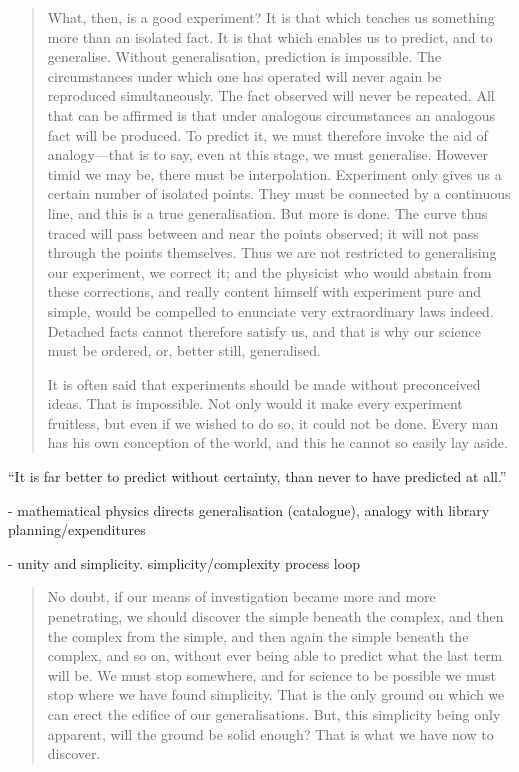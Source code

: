  
 \begin{quote}
     What, then, is a good experiment?  It is that which teaches us something more than an isolated fact.  It is that which enables us to predict, and to generalise.  Without generalisation, prediction is impossible.  The circumstances under which one has operated will never again be reproduced simultaneously.  The fact observed will never be repeated.  All that can be affirmed is that under analogous circumstances an analogous fact will be produced.  To predict it, we must therefore invoke the aid of analogy---that is to say, even at this stage, we must generalise.  However timid we may be, there must be interpolation.  Experiment only gives us a certain number of isolated points.  They must be connected by a continuous line, and this is a true generalisation.  But more is done.  The curve thus traced will pass between and near the points observed; it will not pass through the points themselves.  Thus we are not restricted to generalising our experiment, we correct it; and the physicist who would abstain from these corrections, and really content himself with experiment pure and simple, would be compelled to enunciate very extraordinary laws indeed.  Detached facts cannot therefore satisfy us, and that is why our science must be ordered, or, better still, generalised.
     
     It is often said that experiments should be made without preconceived ideas.  That is impossible.  Not only would it make every experiment fruitless, but even if we wished to do so, it could not be done.  Every man has his own conception of the world, and this he cannot so easily lay aside.  \citep[p. 142-143]{Poincare1952}
 \end{quote}
 
 ``It is far better to predict without certainty, than never to have predicted at all.'' \citep[p. 144]{Poincare1952}
 
 
 - mathematical physics directs generalisation (catalogue), analogy with library planning/expenditures
 
 - unity and simplicity.  simplicity/complexity process loop
 
 \begin{quote}
     No doubt, if our means of investigation became more and more penetrating, we should discover the simple beneath the complex, and then the complex from the simple, and then again the simple beneath the complex, and so on, without ever being able to predict what the last term will be.  We must stop somewhere, and for science to be possible we must stop where we have found simplicity.  That is the only ground on which we can erect the edifice of our generalisations.  But, this simplicity being only apparent, will the ground be solid enough?  That is what we have now to discover.  \citep[p. 148-149]{Poincare1952}
 \end{quote}
 
